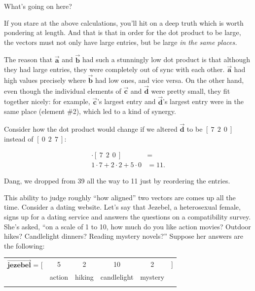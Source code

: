 What's going on here?

\medskip

If you stare at the above calculations, you'll hit on a deep truth which is
worth pondering at length. And that is that in order for the dot product to be
large, the vectors must not only have large entries, but be large \textit{in
the same places.}

The reason that $\overrightarrow{\textbf{a}}$ and $\overrightarrow{\textbf{b}}$
had such a stunningly low dot product is that although they had large entries,
they were completely out of sync with each other. $\overrightarrow{\textbf{a}}$
had high values precisely where $\overrightarrow{\textbf{b}}$ had low ones, and
vice versa. On the other hand, even though the individual elements of
$\overrightarrow{\textbf{c}}$ and  $\overrightarrow{\textbf{d}}$ were pretty
small, they fit together nicely: for example, $\overrightarrow{\textbf{c}}$'s
largest entry and $\overrightarrow{\textbf{d}}$'s largest entry were in the
same place (element \#2), which led to a kind of synergy.

Consider how the dot product would change if we altered
$\overrightarrow{\textbf{d}}$ to be $[\ 7\ \ 2\ \ 0\ ]$ instead of $[\ 0\ \ 2\
\ 7\ ]$:

\vspace{-.15in}
\begin{align*}
[\ 1\ \ 2\ \ 5\ ] \cdot [\ 7\ \ 2\ \ 0\ ] &= \\
1 \cdot 7 + 2 \cdot 2 + 5 \cdot 0 &= 11.
\end{align*}
\vspace{-.15in}

Dang, we dropped from 39 all the way to 11 just by reordering the entries. 

\label{matchmakerExample}

This ability to judge roughly ``how aligned'' two vectors are comes up all the
time. Consider a dating website. Let's say that Jezebel, a heterosexual female,
signs up for a dating service and answers the questions on a compatibility
survey. She's asked, ``on a scale of 1 to 10, how much do you like action
movies? Outdoor hikes? Candlelight dinners? Reading mystery novels?'' Suppose
her answers are the following:

\begin{center}
\begin{tabular}{cccccc}
$\overrightarrow{\textbf{jezebel}}$ = [ & 5 & 2 & 10 & 2 & ] \\
& \scriptsize{action} & \scriptsize{hiking} & \scriptsize{candlelight} &
\scriptsize{mystery} & \\
\normalsize
\end{tabular}
\end{center}
\vspace{-.15in}

